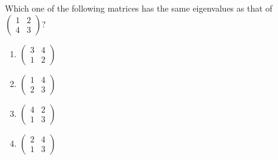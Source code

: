 \item Which one of the following matrices has the same eigenvalues as that of $\begin{pmatrix} 1 & 2 \\ 4 & 3 \end{pmatrix}$?
\begin{enumerate}
    \item $\begin{pmatrix} 3 & 4 \\ 1 & 2 \end{pmatrix}$
    \item $\begin{pmatrix} 1 & 4 \\ 2 & 3 \end{pmatrix}$
    \item $\begin{pmatrix} 4 & 2 \\ 1 & 3 \end{pmatrix}$
    \item $\begin{pmatrix} 2 & 4 \\ 1 & 3 \end{pmatrix}$
\end{enumerate}


